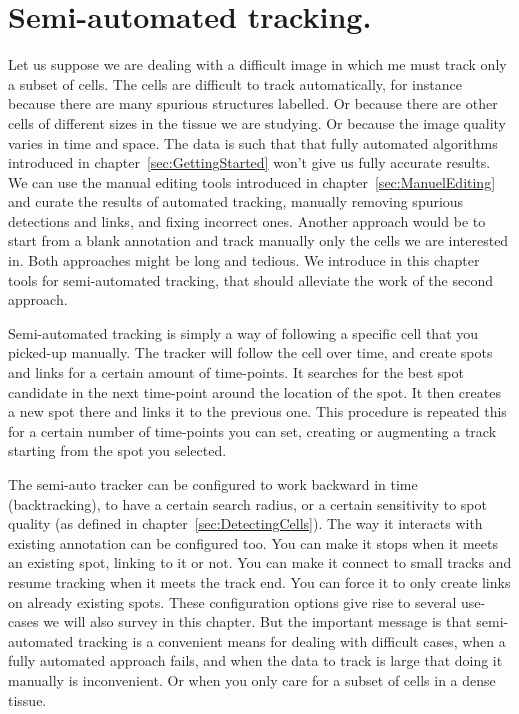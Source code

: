 \section{Semi-automated tracking.}

Let us suppose we are dealing with a difficult image in which me must track only a subset of cells. 
The cells are difficult to track automatically, for instance because there are many spurious structures labelled. 
Or because there are other cells of different sizes in the tissue we are studying. 
Or because the image quality varies in time and space. 
The data is such that that fully automated algorithms introduced in chapter~\ref{sec:GettingStarted} won't give us fully accurate results. 
We can use the manual editing tools introduced in chapter~\ref{sec:ManuelEditing} and curate the results of automated tracking, manually removing spurious detections and links, and fixing incorrect ones. 
Another approach would be to start from a blank annotation and track manually only the cells we are interested in. 
Both approaches might be long and tedious. 
We introduce in this chapter tools for semi-automated tracking, that should alleviate the work of the second approach.

Semi-automated tracking is simply a way of following a specific cell that you picked-up manually. 
The tracker will follow the cell over time, and create spots and links for a certain amount of time-points.
It searches for the best spot candidate in the next time-point around the location of the spot.
It then creates a new spot there and links it to the previous one.
This procedure is repeated this for a certain number of time-points you can set, creating or augmenting a track starting from the spot you selected.

The semi-auto tracker can be configured to work backward in time (backtracking), to have a certain search radius, or a certain sensitivity to spot quality (as defined in chapter~\ref{sec:DetectingCells}).
The way it interacts with existing annotation can be configured too. 
You can make it stops when it meets an existing spot, linking to it or not.
You can make it connect to small tracks and resume tracking when it meets the track end.
You can force it to only create links on already existing spots. 
These configuration options give rise to several use-cases we will also survey in this chapter.
But the important message is that semi-automated tracking is a convenient means for dealing with difficult cases, when a fully automated approach fails, and when the data to track is large that doing it manually is inconvenient.
Or when you only care for a subset of cells in a dense tissue.

